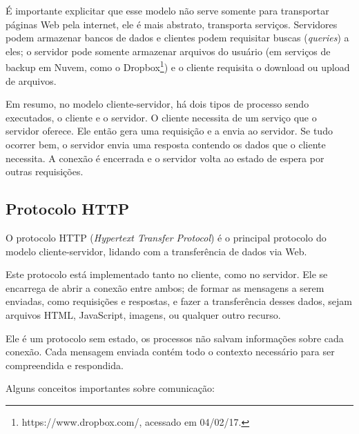 \documentclass[a4paper,12pt]{article}
\begin{document}
É importante explicitar que esse modelo não serve somente para transportar páginas Web pela internet, ele é mais abstrato, transporta serviços. Servidores podem armazenar bancos de dados e clientes podem requisitar buscas (\emph{queries}) a eles; o servidor pode somente armazenar arquivos do usuário (em serviços de backup em Nuvem, como o Dropbox\footnote{https://www.dropbox.com/, acessado em 04/02/17.}) e o cliente requisita o download ou upload de arquivos.

Em resumo, no modelo cliente-servidor, há dois tipos de processo sendo executados, o cliente e o servidor. O cliente necessita de um serviço que o servidor oferece. Ele então gera uma requisição e a envia ao servidor. Se tudo ocorrer bem, o servidor envia uma resposta contendo os dados que o cliente necessita. A conexão é encerrada e o servidor volta ao estado de espera por outras requisições.

\subsection{Protocolo HTTP}

O protocolo HTTP (\emph{Hypertext Transfer Protocol}) é o principal protocolo do modelo cliente-servidor, lidando com a transferência de dados via Web.

Este protocolo está implementado tanto no cliente, como no servidor. Ele se encarrega de abrir a conexão entre ambos; de formar as mensagens a serem enviadas, como requisições e respostas, e fazer a transferência desses dados, sejam arquivos HTML, JavaScript, imagens, ou qualquer outro recurso.

Ele é um protocolo sem estado, os processos não salvam informações sobre cada conexão. Cada mensagem enviada contém todo o contexto necessário para ser compreendida e respondida.

Alguns conceitos importantes sobre comunicação:
\end{document}
